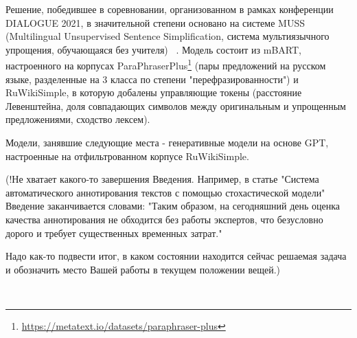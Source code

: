  Решение, победившее в соревновании, организованном в рамках конференции DIALOGUE 2021,  в значительной степени основано на системе MUSS (Multilingual Unsupervised Sentence Simplification, система мультиязычного упрощения, обучающаяся без учителя) ~\cite{martin_muss_2021}. Модель состоит из mBART, настроенного на корпусах ParaPhraserPlus\footnote{\url{https://metatext.io/datasets/paraphraser-plus}} (пары предложений на русском языке, разделенные на 3 класса по степени "перефразированности") и RuWikiSimple, в которую добалены управляющие токены (расстояние Левенштейна, доля совпадающих символов между оригинальным и упрощенным предложениями, сходство лексем).
 
 Модели, занявшие следующие места - генеративные модели на основе GPT, настроенные на отфильтрованном корпусе RuWikiSimple.
 
 (!Не хватает какого-то завершения Введения. Например, в статье "Система автоматического аннотирования текстов с
 помощью стохастической модели" Введение заканчивается словами:
 "Таким образом, на сегодняшний день оценка качества аннотирования не обходится без
 работы экспертов, что безусловно дорого и требует существенных временных затрат."
 
 Надо как-то подвести итог, в каком состоянии находится сейчас решаемая задача и обозначить место Вашей работы в текущем положении вещей.)

~\cite{martin_muss_2021}
\cite{voznesenskaya_automatic_2018}
~\cite{kazan_federal_university_kazan_russia_rusimplesenteval-2021_2021}
~\cite{noauthor_bart_nodate}
~\cite{noauthor_191013461_nodate}
~\cite{saint_petersburg_russia_rusimscore_2021}






